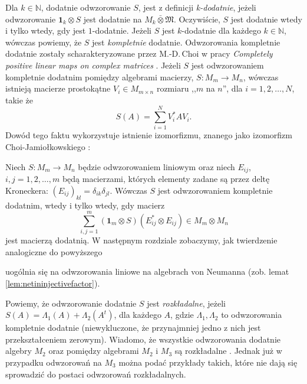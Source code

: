 Dla $k \in \mathbb{N}$, dodatnie odwzorowanie $S$,
jest z definicji \emph{k-dodatnie}, jeżeli
odwzorowanie
$\mathbf{1}_{k} \otimes S$
jest dodatnie na $M_{k} \bar{\otimes} \mathfrak{M}$.
Oczywiście, $S$ jest dodatnie wtedy i tylko wtedy, gdy jest $1$-dodatnie.
Jeżeli $S$ jest $k$-dodatnie dla każdego $k \in \mathbb{N}$,
wówczas powiemy, że $S$ jest \emph{kompletnie} dodatnie.
Odwzorowania kompletnie dodatnie zostały scharakteryzowane przez M.-D.\,Choi
w pracy \emph{Completely positive linear maps on complex matrices}
\cite{choi1975completely}.
Jeżeli $S$ jest odwzorowaniem kompletnie dodatnim pomiędzy algebrami macierzy,
$S: M_{m} \rightarrow M_{n}$, wówczas istnieją macierze prostokątne
$V_{i} \in M_{m \times n}$ rozmiaru ,,$m$ na $n$'', dla $i = 1,2,\ldots,N$,
takie że
\begin{equation}
    S(A) = \sum \limits_{i = 1}^{N} V_{i}^{*} A V_{i}.
\end{equation}
Dowód tego faktu wykorzystuje istnienie izomorfizmu,
znanego jako izomorfizm Choi-Jamiołkowskiego
\cite{choi1975completely, jamiolkowski1974effective}:
\begin{Theorem}
    Niech $S: M_{m} \rightarrow M_{n}$ będzie odwzorowaniem liniowym
    oraz niech $E_{ij}$, $i,j = 1,2,\ldots,m$ będą macierzami, których
    elementy zadane są przez deltę Kroneckera:
    $(E_{ij})_{kl} = \delta_{ik} \delta_{jl}$.
    Wówczas $S$ jest odwzorowaniem kompletnie dodatnim,
    wtedy i tylko wtedy, gdy macierz
    \begin{equation}
        \sum \limits_{i,j=1}^{m} (\mathbf{1}_{m} \otimes S)
            (E_{ij}^{*} \otimes E_{ij}) \in M_{m} \otimes M_{n}
    \end{equation}
    jest macierzą dodatnią.
W następnym rozdziale zobaczymy, jak twierdzenie analogiczne do powyższego
\end{Theorem}
uogólnia się na odwzorowania liniowe na algebrach von Neumanna
(zob. lemat \ref{lem:netininjectivefactor}).

Powiemy, że odwzorowanie dodatnie $S$ jest \emph{rozkładalne}, jeżeli
 $S(A) = \Lambda_{1}(A) + \Lambda_{2} (A^{t})$,
 dla każdego $A$,
gdzie $\Lambda_{1}, \Lambda_{2}$ to odwzorowania kompletnie dodatnie
(niewykluczone, że przynajmniej jedno z nich jest przekształceniem zerowym).
Wiadomo, że wszystkie odwzorowania dodatnie algebry $M_{2}$
oraz pomiędzy algebrami $M_{2}$ i $M_{3}$ są rozkładalne
\cite{Stormer2013}.
Jednak już w przypadku odwzorowań na $M_{3}$ można podać przykłady takich,
które nie dają się sprowadzić do postaci odwzorowań rozkładalnych.

